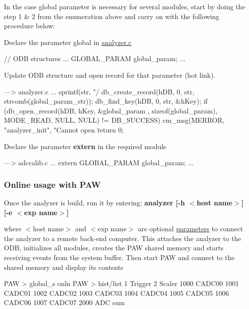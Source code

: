 In the case global parameter is necessary for several modules, start by doing the step 1 \& 2 from the enumeration above and carry on with the following procedure below:
\begin{DoxyEnumerate}
\item Declare the parameter global in \hyperlink{analyzer_8c}{analyzer.c} 
\begin{DoxyCode}
// ODB structures 
...
GLOBAL_PARAM     global_param;
...
\end{DoxyCode}

\item Update ODB structure and open record for that parameter (hot link). 
\begin{DoxyCode}
---> analyzer.c
...
sprintf(str, "/%
db_create_record(hDB, 0, str, strcomb(global_param_str));
db_find_key(hDB, 0, str, &hKey);
if (db_open_record(hDB, hKey, &global_param
    , sizeof(global_param), MODE_READ, NULL, NULL) != DB_SUCCESS) {
  cm_msg(MERROR, "analyzer_init", "Cannot open \"%
  return 0;
}
\end{DoxyCode}

\item Declare the parameter {\bfseries extern} in the required module 
\begin{DoxyCode}
---> adccalib.c
...
extern GLOBAL_PARAM  global_param;
...
\end{DoxyCode}

\end{DoxyEnumerate}\hypertarget{DataAnalysis_PAW_Online_usage}{}\subsubsection{Online usage with PAW}\label{DataAnalysis_PAW_Online_usage}
Once the analyzer is build, run it by entering: {\bfseries  analyzer \mbox{[}-\/h $<$host name$>$\mbox{]} \mbox{[}-\/e $<$exp name$>$\mbox{]} }

where $<$host name$>$ and $<$exp name$>$ are optional \hyperlink{structparameters}{parameters} to connect the analyzer to a remote back-\/end computer. This attaches the analyzer to the ODB, initializes all modules, creates the PAW shared memory and starts receiving events from the system buffer. Then start PAW and connect to the shared memory and display its contents


\begin{DoxyCode}
PAW > global_s onln
PAW > hist/list
    1  Trigger
    2  Scaler
 1000  CADC00
 1001  CADC01
 1002  CADC02
 1003  CADC03
 1004  CADC04
 1005  CADC05
 1006  CADC06
 1007  CADC07
 2000  ADC sum
\end{DoxyCode}


